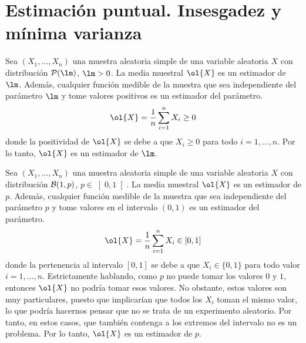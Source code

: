 \section{Estimación puntual. Insesgadez y mínima varianza}

\begin{ejemplo}
    Sea $(X_1, \ldots, X_n)$ una muestra aleatoria simple de una variable aleatoria $X$ con distribución $\cc{P}(\lm)$, $\lm > 0$. La media muestral $\ol{X}$ es un estimador de $\lm$. Además, cualquier función medible de la muestra que sea independiente del parámetro $\lm$ y tome valores positivos es un estimador del parámetro.
    \begin{equation*}
        \ol{X} = \frac{1}{n} \sum_{i=1}^{n} X_i \geq 0
    \end{equation*}
    donde la positividad de $\ol{X}$ se debe a que $X_i \geq 0$ para todo $i = 1, \ldots, n$.
    Por lo tanto, $\ol{X}$ es un estimador de $\lm$.
\end{ejemplo}

\begin{ejemplo}
    Sea $(X_1, \ldots, X_n)$ una muestra aleatoria simple de una variable aleatoria $X$ con distribución $\mathcal{B}(1, p)$, $p \in \left]0, 1\right[$. La media muestral $\ol{X}$ es un estimador de $p$. Además, cualquier función medible de la muestra que sea independiente del parámetro $p$ y tome valores en el intervalo $(0, 1)$ es un estimador del parámetro.
    \begin{equation*}
        \ol{X} = \frac{1}{n} \sum_{i=1}^{n} X_i \in \left[0, 1\right]
    \end{equation*}
    donde la pertenencia al intervalo $\left[0, 1\right]$ se debe a que $X_i \in \{0, 1\}$ para todo valor $i = 1, \ldots, n$. Estrictamente hablando, como $p$ no puede tomar los valores $0$ y $1$, entonces $\ol{X}$ no podría tomar esos valores. No obstante, estos valores son muy particulares, puesto que implicarían que todos los $X_i$ toman el mismo valor, lo que podría hacernos pensar que no se trata de un experimento aleatorio. Por tanto, en estos casos, que también contenga a los extremos del intervalo no es un problema.
    Por lo tanto, $\ol{X}$ es un estimador de $p$.
\end{ejemplo}

